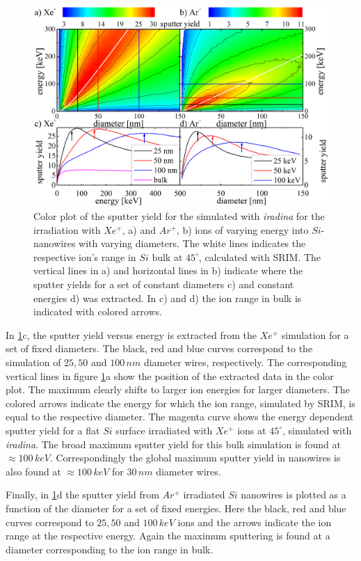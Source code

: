 \begin{figure}[th]
	\centering
		\includegraphics[width=.9\textwidth]{images/sputtering_diameter_energy.png}
	\caption{Color plot of the sputter yield for the simulated with \emph{iradina} for the irradiation with $Xe^+$, a) and $Ar^+$, b) ions of varying energy into $Si$-nanowires with varying diameters. The white lines indicates the respective ion's range in $Si$ bulk at $45^\circ$, calculated with SRIM. The vertical lines in a) and horizontal lines in b) indicate where the sputter yields for a set of constant diameters c) and constant energies d) was extracted. In c) and d) the ion range in bulk is indicated with colored arrows.} 
	\label{sputtering_de}
\end{figure} 

In \ref{sputtering_de}c, the sputter yield versus energy is extracted from the $Xe^+$ simulation for a set of fixed diameters. The black, red and blue curves correspond to the simulation of $25, 50$ and $100\,nm$ diameter wires, respectively. The corresponding vertical lines in figure \ref{sputtering_de}a show the position of the extracted data in the color plot. The maximum clearly shifts to larger ion energies for larger diameters. The colored arrows indicate the energy for which the ion range, simulated by SRIM, is equal to the respective diameter. The magenta curve shows the energy dependent sputter yield for a flat $Si$ surface irradiated with $Xe^+$ ions at $45^\circ$, simulated with \emph{iradina}. The broad maximum sputter yield for this bulk simulation is found at $\approx 100 \,keV$. Correspondingly the global maximum sputter yield in nanowires is also found at $\approx 100 \,keV$ for $30\,nm$ diameter wires.

Finally, in \ref{sputtering_de}d the sputter yield from $Ar^+$ irradiated $Si$ nanowires is plotted as a function of the diameter for a set of fixed energies. Here the black, red and blue curves correspond to $25, 50$ and $100\,keV$ ions and the arrows indicate the ion range at the respective energy. Again the maximum sputtering is found at a diameter corresponding to the ion range in bulk.

